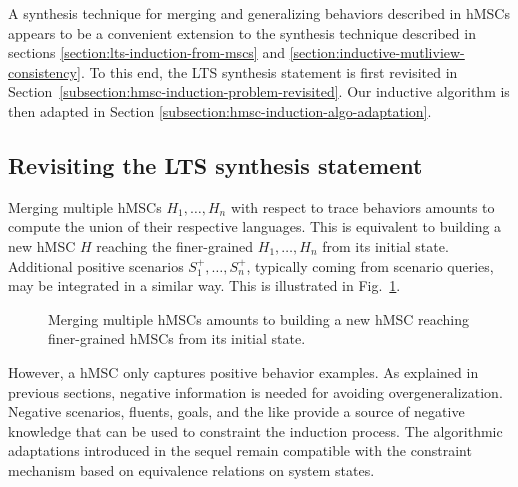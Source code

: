 A synthesis technique for merging and generalizing behaviors described in hMSCs appears to be a convenient extension to the synthesis technique described in sections \ref{section:lts-induction-from-mscs} and \ref{section:inductive-mutliview-consistency}. To this end, the LTS synthesis statement is first revisited in Section~\ref{subsection:hmsc-induction-problem-revisited}. Our inductive algorithm is then adapted in Section \ref{subsection:hmsc-induction-algo-adaptation}.

\subsection{Revisiting the LTS synthesis statement\label{subsection:hmsc-induction-problem-revisited}}

Merging multiple hMSCs $H_1,\ldots,H_n$ with respect to trace behaviors amounts to compute the union of their respective languages. This is equivalent to building a new hMSC $H$ reaching the finer-grained $H_1,\ldots,H_n$ from its initial state. Additional positive scenarios $S^+_1,\ldots,S^+_n$, typically coming from scenario queries, may be integrated in a similar way. This is illustrated in Fig.~\ref{figure:multiple-hmscs}.

\begin{figure}\centering
{}
\caption{Merging multiple hMSCs amounts to building a new hMSC reaching finer-grained hMSCs from its initial state.\label{figure:multiple-hmscs}} 
\end{figure}

However, a hMSC only captures positive behavior examples. As explained in previous sections, negative information is needed for avoiding overgeneralization. Negative scenarios, fluents, goals, and the like provide a source of negative knowledge that can be used to constraint the induction process. The algorithmic adaptations introduced in the sequel remain compatible with the constraint mechanism based on equivalence relations on system states.

